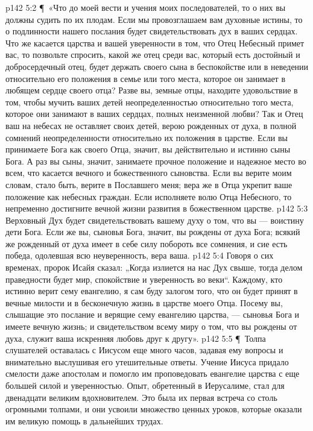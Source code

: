\vs p142 5:2 \P\ «Что до моей вести и учения моих последователей, то о них вы должны судить по их плодам. Если мы провозглашаем вам духовные истины, то о подлинности нашего послания будет свидетельствовать дух в ваших сердцах. Что же касается царства и вашей уверенности в том, что Отец Небесный примет вас, то позвольте спросить, какой же отец среди вас, который есть достойный и добросердечный отец, будет держать своего сына в беспокойстве или в неведении относительно его положения в семье или того места, которое он занимает в любящем сердце своего отца? Разве вы, земные отцы, находите удовольствие в том, чтобы мучить ваших детей неопределенностью относительно того места, которое они занимают в ваших сердцах, полных неизменной любви? Так и Отец ваш на небесах не оставляет своих детей, верою рожденных от духа, в полной сомнений неопределенности относительно их положения в царстве. Если вы принимаете Бога как своего Отца, значит, вы действительно и истинно сыны Бога. А раз вы сыны, значит, занимаете прочное положение и надежное место во всем, что касается вечного и божественного сыновства. Если вы верите моим словам, стало быть, верите в Пославшего меня; вера же в Отца укрепит ваше положение как небесных граждан. Если исполняете волю Отца Небесного, то непременно достигните вечной жизни развития в божественном царстве.
\vs p142 5:3 Верховный Дух будет свидетельствовать вашему духу о том, что вы --- воистину дети Бога. Если же вы, сыновья Бога, значит, вы рождены от духа Бога; всякий же рожденный от духа имеет в себе силу побороть все сомнения, и сие есть победа, одолевшая всю неуверенность, вера ваша.
\vs p142 5:4 Говоря о сих временах, пророк Исайя сказал: „Когда излиется на нас Дух свыше, тогда делом праведности будет мир, спокойствие и уверенность во веки“. Каждому, кто истинно верит сему евангелию, я сам буду залогом того, что он будет принят в вечные милости и в бесконечную жизнь в царстве моего Отца. Посему вы, слышащие это послание и верящие сему евангелию царства, --- сыновья Бога и имеете вечную жизнь; и свидетельством всему миру о том, что вы рождены от духа, служит ваша искренняя любовь друг к другу».
\vs p142 5:5 \P\ Толпа слушателей оставалась с Иисусом еще много часов, задавая ему вопросы и внимательно выслушивая его утешительные ответы. Учение Иисуса придало смелости даже апостолам и помогло им проповедовать евангелие царства с еще большей силой и уверенностью. Опыт, обретенный в Иерусалиме, стал для двенадцати великим вдохновителем. Это была их первая встреча со столь огромными толпами, и они усвоили множество ценных уроков, которые оказали им великую помощь в дальнейших трудах.
